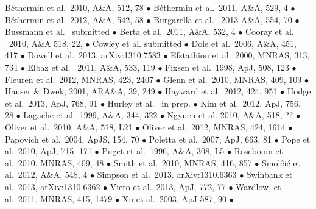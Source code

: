 \documentclass[12pt,a4paper]{article}
\begin{document}
B\'ethermin et al.\ 2010, A\&A, 512, 78 $\bullet$
B\'ethermin et al.\ 2011, A\&A, 529, 4 $\bullet$ 
B\'ethermin et al.\ 2012, A\&A, 542, 58 $\bullet$
Burgarella et al. \ 2013 A\&A, 554, 70 $\bullet$
Bussmann et al. \ submitted $\bullet$
Berta et al.\ 2011, A\&A, 532, 4 $\bullet$
Cooray et al. \ 2010, A\&A 518, 22, $\bullet$
Cowley et al. submitted $\bullet$
Dole et al.\ 2006, A\&A, 451, 417 $\bullet$
Dowell et al.\ 2013, arXiv:1310.7583 $\bullet$
Efstathiou et al.\ 2000, MNRAS, 313, 734 $\bullet$
Elbaz et al. \ 2011, A\&A, 533, 119 $\bullet$
Fixsen et al.\ 1998, ApJ, 508, 123 $\bullet$
Fleuren et al.\ 2012, MNRAS, 423, 2407 $\bullet$
Glenn et al.\ 2010, MNRAS, 409, 109 $\bullet$
Hauser \& Dwek, 2001, ARA\&A, 39, 249 $\bullet$
Hayward et al.\ 2012, 424, 951 $\bullet$
Hodge et al.\ 2013, ApJ, 768, 91 $\bullet$
Hurley et al. \ in prep. $\bullet$
Kim et al.\ 2012, ApJ, 756, 28 $\bullet$
Lagache et al.\ 1999, A\&A, 344, 322 $\bullet$
Ngyuen et al. 2010, A\&A, 518, ?? $\bullet$
Oliver et al.\ 2010, A\&A, 518, L21 $\bullet$
Oliver et al.\ 2012, MNRAS, 424, 1614 $\bullet$
Papovich et al.\ 2004, ApJS, 154, 70 $\bullet$
Poletta et al.\ 2007, ApJ, 663, 81 $\bullet$
Pope et al.\ 2010, ApJ, 715, 171 $\bullet$
Puget et al.\ 1996, A\&A, 308, L5 $\bullet$
Roseboom et al.\ 2010, MNRAS, 409, 48 $\bullet$
Smith et al.\ 2010, MNRAS, 416, 857 $\bullet$
Smol\^ci\'c et al.\ 2012, A\&A, 548, 4 $\bullet$
Simpson et al.\ 2013. arXiv:1310.6363 $\bullet$
Swinbank et al.\ 2013, arXiv:1310.6362 $\bullet$
Viero et al.\ 2013, ApJ, 772, 77 $\bullet$
Wardlow, et al.\ 2011, MNRAS, 415, 1479 $\bullet$
Xu et al.\ 2003, ApJ 587, 90 $\bullet$



\end{document}
